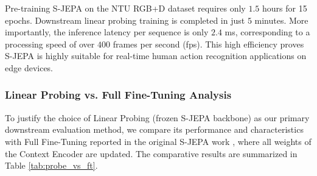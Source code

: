 \documentclass[conference]{IEEEtran}
\begin{document}
Pre-training S-JEPA on the NTU RGB+D dataset requires only $1.5$ hours for 15 epochs. Downstream linear probing training is completed in just $5$ minutes. More importantly, the inference latency per sequence is only $2.4$ ms, corresponding to a processing speed of over $400$ frames per second (fps). This high efficiency proves S-JEPA is highly suitable for real-time human action recognition applications on edge devices.

\subsubsection{Linear Probing vs. Full Fine-Tuning Analysis}
To justify the choice of Linear Probing (frozen S-JEPA backbone) as our primary downstream evaluation method, we compare its performance and characteristics with Full Fine-Tuning reported in the original S-JEPA work \cite{b7}, where all weights of the Context Encoder are updated. The comparative results are summarized in Table \ref{tab:probe_vs_ft}.

\begin{table}[htbp]
\centering
\caption{Classification Performance Comparison: Linear Probing vs. Full Fine-Tuning.}
\label{tab:probe_vs_ft}
\end{table}
\end{document}
